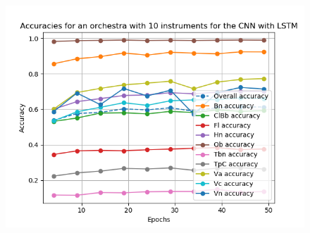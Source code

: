 \documentclass{article}
\begin{document}
\begin{figure}
\includegraphics[scale=0.6]{figs/CNN10.png}
\end{figure}



%
%
%
%
\end{document}
